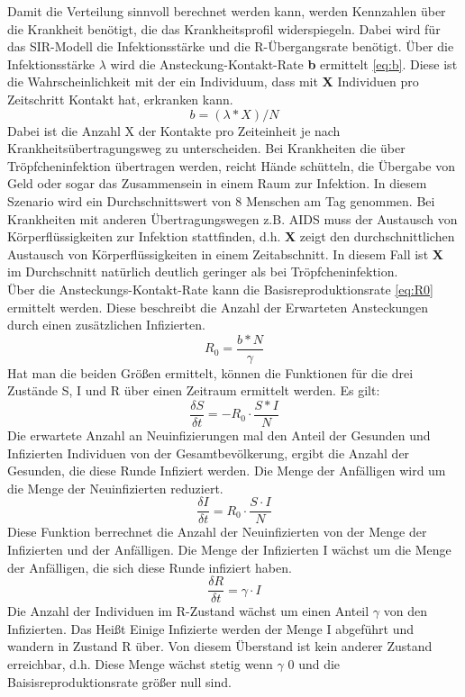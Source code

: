 Damit die Verteilung sinnvoll berechnet werden kann, werden Kennzahlen über die Krankheit benötigt, die das Krankheitsprofil widerspiegeln. Dabei wird für das SIR-Modell die Infektionsstärke und die \grqq R\glqq{}-Übergangsrate benötigt.
Über die Infektionsstärke $\lambda$ wird die Ansteckung-Kontakt-Rate \textbf{b} ermittelt \ref{eq:b}. Diese ist die Wahrscheinlichkeit mit der ein Individuum, dass mit \textbf{X} Individuen pro Zeitschritt Kontakt hat, erkranken kann.
\begin{equation} \label{eq:b}
b = ( \lambda * X ) / N
\end{equation}
Dabei ist die Anzahl X der Kontakte pro Zeiteinheit je nach Krankheitsübertragungsweg zu unterscheiden. Bei Krankheiten die über Tröpfcheninfektion übertragen werden, reicht Hände schütteln, die Übergabe von Geld oder sogar das Zusammensein in einem Raum zur Infektion. In diesem Szenario wird ein Durchschnittswert von 8 Menschen am Tag genommen.
Bei Krankheiten mit anderen Übertragungswegen z.B. AIDS muss der Austausch von Körperflüssigkeiten zur Infektion stattfinden, d.h. \textbf{X} zeigt den durchschnittlichen Austausch von Körperflüssigkeiten in einem Zeitabschnitt. In diesem Fall ist \textbf{X} im Durchschnitt natürlich deutlich geringer als bei Tröpfcheninfektion.\\
Über die Ansteckungs-Kontakt-Rate kann die Basisreproduktionsrate \ref{eq:R0} ermittelt werden. Diese beschreibt die Anzahl der Erwarteten Ansteckungen durch einen zusätzlichen Infizierten.
\begin{equation}\label{eq:R0}
R_0 = \frac{ b * N }{ \gamma }
\end{equation}
Hat man die beiden Größen ermittelt, können die Funktionen für die drei Zustände S, I und R über einen Zeitraum ermittelt werden. 
Es gilt:
\begin{equation}
\frac{ \delta S }{ \delta t } = -R_0 \cdot \frac{S * I}{N}
\end{equation}
Die erwartete Anzahl an Neuinfizierungen mal den Anteil der Gesunden und Infizierten Individuen von der Gesamtbevölkerung, ergibt die Anzahl der Gesunden, die diese Runde Infiziert werden. Die Menge der Anfälligen wird um die Menge der Neuinfizierten reduziert.
\begin{equation}
\frac{\delta I }{\delta t} = R_0 \cdot \frac{S \cdot I}{N}
\end{equation}
Diese Funktion berrechnet die Anzahl der Neuinfizierten von der Menge der Infizierten und der Anfälligen. Die Menge der Infizierten I wächst um die Menge der Anfälligen, die sich diese Runde infiziert haben.
\begin{equation}
\frac{\delta R }{\delta t} = \gamma \cdot I
\end{equation}
Die Anzahl der Individuen im R-Zustand wächst um einen Anteil $\gamma$ von den Infizierten. Das Heißt Einige Infizierte werden der Menge I abgeführt und wandern in Zustand R über. Von diesem Überstand ist kein anderer Zustand erreichbar, d.h. Diese Menge wächst stetig wenn $\gamma$ 0 und die Baisisreproduktionsrate größer null sind.

